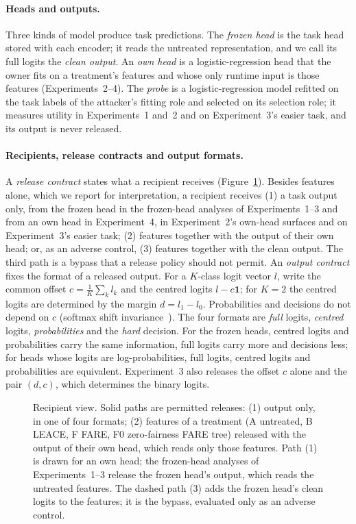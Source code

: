 \documentclass[10pt]{article}
\begin{document}
\paragraph{Heads and outputs.} Three kinds of model produce task predictions. The \emph{frozen head} is the task head
stored with each encoder; it reads the untreated representation, and we call its full logits the \emph{clean output}.
An \emph{own head} is a logistic-regression head that the owner fits on a treatment's features and whose only runtime input is those features (Experiments~2--4). The \emph{probe} is a logistic-regression model refitted on the task
labels of the attacker's fitting role and selected on its selection role; it measures utility in Experiments~1 and~2 and on Experiment~3's easier task, and its output is never released.

\paragraph{Recipients, release contracts and output formats.} A \emph{release contract} states what a recipient receives
(Figure~\ref{fig:recipient}). Besides features alone, which we report for interpretation, a recipient receives (1) a task output only, from the frozen head in the frozen-head analyses of Experiments~1--3 and from an own head in
Experiment~4, in Experiment~2's own-head surfaces and on Experiment~3's easier task; (2) features together
with the output of their own head; or, as an adverse control, (3) features together with the clean output. The third
path is a bypass that a release policy should not permit. An \emph{output contract} fixes the format of a released
output. For a $K$-class logit vector $l$, write the common offset $c=\frac1K\sum_k l_k$ and the centred logits
$l-c\mathbf 1$; for $K=2$ the centred logits are determined by the margin $d=l_1-l_0$. Probabilities and decisions do
not depend on $c$ (softmax shift invariance~\citep[\S4.1]{goodfellow2016deep}). The four formats are \emph{full}
logits, \emph{centred} logits, \emph{probabilities} and the \emph{hard} decision. For the frozen heads, centred logits
and probabilities carry the same information, full logits carry more and decisions less; for heads whose logits are
log-probabilities, full logits, centred logits and probabilities are equivalent. Experiment~3 also releases the offset
$c$ alone and the pair $(d,c)$, which determines the binary logits.

\begin{figure}[t]
\centering
\resizebox{\linewidth}{!}{}
\caption{Recipient view. Solid paths are permitted releases: (1) output only, in one of four formats; (2) features of
a treatment (A untreated, B LEACE, F FARE, F0 zero-fairness FARE tree) released with the output of their own head,
which reads only those features. Path (1) is drawn for an own head; the frozen-head analyses of Experiments~1--3 release the frozen head's output,
which reads the untreated features. The dashed path (3) adds the frozen head's clean
logits to the features; it is the bypass, evaluated only as an adverse control.}
\label{fig:recipient}
\end{figure}
\end{document}
